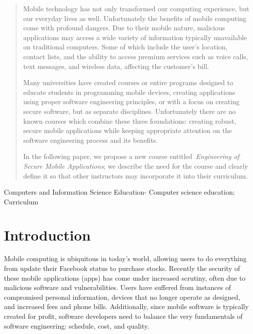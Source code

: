 \documentclass{sig-alternate}
\begin{document}
\maketitle
\begin{abstract}
Mobile technology has not only transformed our computing experience, but our everyday lives as well. Unfortunately the benefits of mobile computing come with profound dangers. Due to their mobile nature, malicious applications may access a wide variety of information typically unavailable on traditional computers. Some of which include the user's location, contact lists, and the ability to access premium services such as voice calls, text messages, and wireless data, affecting the customer's bill.

Many universities have created courses or entire programs designed to educate students in programming mobile devices, creating applications using proper software engineering principles, or with a focus on creating secure software, but as separate disciplines. Unfortunately there are no known courses which combine these three foundations: creating robust, secure mobile applications while keeping appropriate attention on the software engineering process and its benefits.

In the following paper, we propose a new course entitled~\emph{Engineering of Secure Mobile Applications}; we describe the need for the course and clearly define it so that other instructors may incorporate it into their curriculum.\\ %



\end{abstract}

Computers and Information
Science Education- Computer science education; Curriculum




\section{Introduction}
Mobile computing is ubiquitous in today's world, allowing users to do everything from update their Facebook status to purchase stocks. Recently the security of these mobile applications (apps) has come under increased scrutiny, often due to malicious software and vulnerabilities. Users have suffered from instances of compromised personal information, devices that no longer operate as designed, and increased fees and phone bills. Additionally, since mobile software is typically created for profit, software developers need to balance the very fundamentals of software engineering: schedule, cost, and quality.
\end{document}
